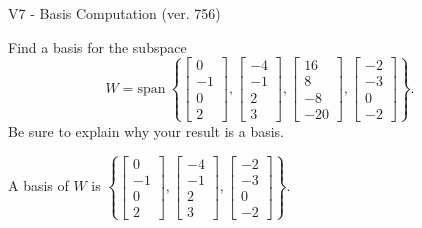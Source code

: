 \begin{exercise}
  \begin{exerciseTitle}V7 - Basis Computation (ver. 756)\end{exerciseTitle}
  \begin{exerciseStatement}
    Find a basis for the subspace 
\[W=\mathrm{span}\ \left\{\left[\begin{array}{r}
0 \\
-1 \\
0 \\
2
\end{array}\right] , \left[\begin{array}{r}
-4 \\
-1 \\
2 \\
3
\end{array}\right] , \left[\begin{array}{r}
16 \\
8 \\
-8 \\
-20
\end{array}\right] , \left[\begin{array}{r}
-2 \\
-3 \\
0 \\
-2
\end{array}\right]\right\}.\]
 Be sure to explain why your result is a basis.


  \end{exerciseStatement}
  \begin{exerciseAnswer}
   A basis of \(W\) is  \(\left\{\left[\begin{array}{r}
0 \\
-1 \\
0 \\
2
\end{array}\right] , \left[\begin{array}{r}
-4 \\
-1 \\
2 \\
3
\end{array}\right] , \left[\begin{array}{r}
-2 \\
-3 \\
0 \\
-2
\end{array}\right]\right\}\).
  


  \end{exerciseAnswer}
\end{exercise}